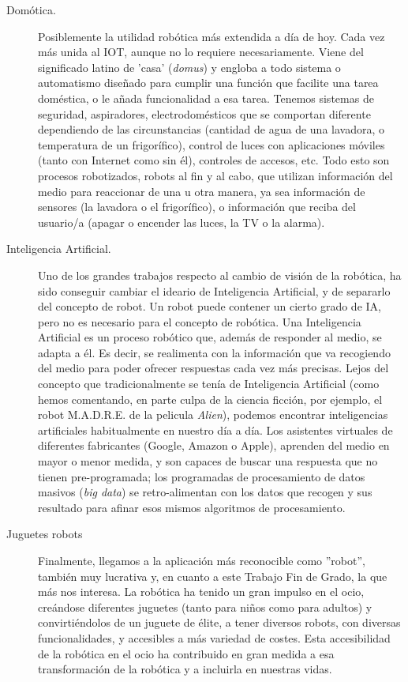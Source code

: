 \begin{description}
	\item [Domótica.] Posiblemente la utilidad robótica más extendida a día de hoy. Cada vez más unida al IOT, aunque no lo requiere necesariamente. Viene del significado latino de 'casa' (\textit{domus}) y engloba a todo sistema o automatismo diseñado para cumplir una función que facilite una tarea doméstica, o le añada funcionalidad a esa tarea. Tenemos sistemas de seguridad, aspiradores, electrodomésticos que se comportan diferente dependiendo de las circunstancias (cantidad de agua de una lavadora, o temperatura de un frigorífico), control de luces con aplicaciones móviles (tanto con Internet como sin él), controles de accesos, etc. Todo esto son procesos robotizados, robots al fin y al cabo, que utilizan información del medio para reaccionar de una u otra manera, ya sea información de sensores (la lavadora o el frigorífico), o información que reciba del usuario/a (apagar o encender las luces, la TV o la alarma).
	
	\item [Inteligencia Artificial.] Uno de los grandes trabajos respecto al cambio de visión de la robótica, ha sido conseguir cambiar el ideario de Inteligencia Artificial, y de separarlo del concepto de robot. Un robot puede contener un cierto grado de IA, pero no es necesario para el concepto de robótica. Una Inteligencia Artificial es un proceso robótico que, además de responder al medio, se adapta a él. Es decir, se realimenta con la información que va recogiendo del medio para poder ofrecer respuestas cada vez más precisas. Lejos del concepto que tradicionalmente se tenía de Inteligencia Artificial (como hemos comentando, en parte culpa de la ciencia ficción, por ejemplo, el robot M.A.D.R.E. de la pelicula \textit{Alien}), podemos encontrar inteligencias artificiales habitualmente en nuestro día a día. Los asistentes virtuales de diferentes fabricantes (Google, Amazon o Apple), aprenden del medio en mayor o menor medida, y son capaces de buscar una respuesta que no tienen pre-programada; los programadas de procesamiento de datos masivos (\textit{big data}) se retro-alimentan con los datos que recogen y sus resultado para afinar esos mismos algoritmos de procesamiento.
	
	\item [Juguetes robots] Finalmente, llegamos a la aplicación más reconocible como ''robot'', también muy lucrativa y, en cuanto a este Trabajo Fin de Grado, la que más nos interesa. La robótica ha tenido un gran impulso en el ocio, creándose diferentes juguetes (tanto para niños como para adultos) y convirtiéndolos de un juguete de élite, a tener diversos robots, con diversas funcionalidades, y accesibles a más variedad de costes. Esta accesibilidad de la robótica en el ocio ha contribuido en gran medida a esa transformación de la robótica y a incluirla en nuestras vidas.
\end{description}


